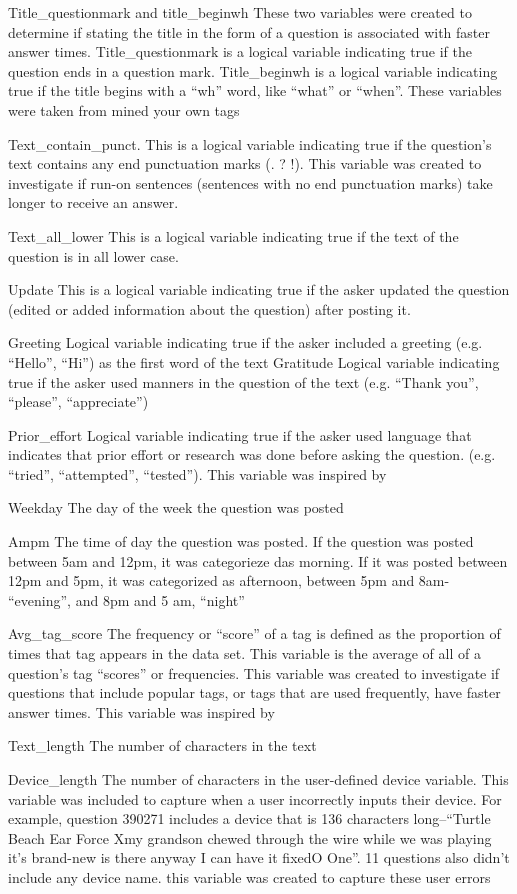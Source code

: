 \documentclass[12pt]{article}
\begin{document}
Title_questionmark and title_beginwh 
These two variables were created to determine if stating the title in the form of a question is associated with faster answer times. Title_questionmark is a logical variable indicating true if the question ends in a question mark. Title_beginwh is a logical variable indicating true if the title begins with a “wh” word, like “what” or “when”. These variables were taken from mined your own tags

Text_contain_punct.
This is a logical variable indicating true if the question’s text contains any end punctuation marks (. ? !). This variable was created to investigate if run-on sentences (sentences with no end punctuation marks) take longer to receive an answer. 

Text_all_lower
This is a logical variable indicating true if the text of the question is in all lower case. 

Update 
This is a logical variable indicating true if the asker updated the question (edited or added information about the question) after posting it. 

Greeting
Logical variable indicating true if the asker included a greeting (e.g. “Hello”, “Hi”) as the first word of the text
Gratitude
Logical variable indicating true if the asker used manners in the question of the text (e.g. “Thank you”, “please”, “appreciate”)

Prior_effort 
Logical variable indicating true if the asker used language that indicates that prior effort or research was done before asking the question. (e.g. “tried”, “attempted”, “tested”). This variable was inspired by 

Weekday 
The day of the week the question was posted

Ampm 
The time of day the question was posted. If the question was posted between 5am and 12pm, it was categorieze das morning. If it was posted between 12pm and 5pm, it was categorized as afternoon, between 5pm and 8am- “evening”, and 8pm and 5 am, “night”

Avg_tag_score
The frequency or “score” of a tag is defined as the proportion of times that tag appears in the data set. This variable is the average of all of a question’s tag “scores” or frequencies. This variable was created to investigate if questions that include popular tags, or tags that are used frequently, have faster answer times. This variable was inspired by 

Text_length
The number of characters in the text

Device_length
The number of characters in the user-defined device variable. This variable was included to capture when a user incorrectly inputs their device. For example, question 390271 includes a device that is 136 characters long--“Turtle Beach Ear Force Xmy grandson chewed through the wire while we was playing it's brand-new is there anyway I can have it fixedO One”. 11 questions also didn’t include any device name. this variable was created to capture these user errors
\end{document}
